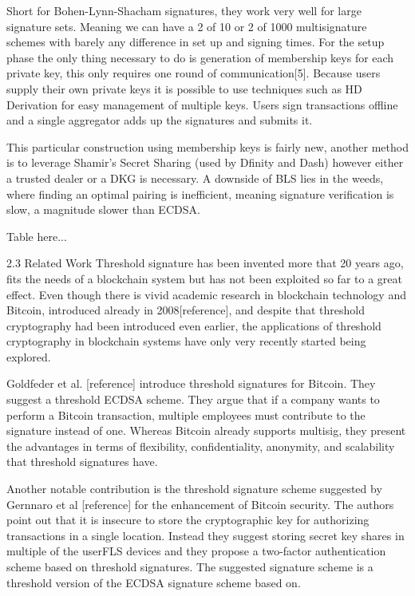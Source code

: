 Short for Bohen-Lynn-Shacham signatures, they work very well for large signature sets. Meaning we can have a 2 of 10 or 2 of 1000 multisignature schemes with barely any difference in set up and signing times. For the setup phase the only thing necessary to do is generation of membership keys for each private key, this only requires one round of communication[5]. Because users supply their own private keys it is possible to use techniques such as HD Derivation for easy management of multiple keys. Users sign transactions offline and a single aggregator adds up the signatures and submits it.

This particular construction using membership keys is fairly new, another method is to leverage Shamir’s Secret Sharing (used by Dfinity and Dash) however either a trusted dealer or a DKG is necessary. A downside of BLS lies in the weeds, where finding an optimal pairing is inefficient, meaning signature verification is slow, a magnitude slower than ECDSA.


Table here...

2.3 Related Work
Threshold signature has been invented more that 20 years ago, fits the needs of a blockchain system but has not been exploited so far to a great effect. Even though there is vivid academic research in blockchain technology and Bitcoin, introduced already in 2008[reference], and despite that threshold cryptography had been introduced even earlier, the applications of threshold cryptography in blockchain systems have only very recently started being explored. 
 
Goldfeder et al. [reference] introduce threshold signatures for Bitcoin. They suggest a threshold ECDSA scheme. They argue that if a company wants to perform a Bitcoin transaction, multiple employees must contribute to the signature instead of one. Whereas Bitcoin already supports multisig, they present the advantages in terms of flexibility, confidentiality, anonymity, and scalability that threshold signatures have. 
 
Another notable contribution is the threshold signature scheme suggested by Gernnaro et al [reference] for the enhancement of Bitcoin security. The authors point out that it is insecure to store the cryptographic key for authorizing transactions in a single location. Instead they suggest storing secret key shares in multiple of the userFLS devices and they propose a two-factor authentication scheme based on threshold signatures. The suggested signature scheme is a threshold version of the ECDSA signature scheme based on. 
 
